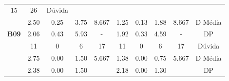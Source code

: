 \begin{table}[htbp]
\begin{tabular}{|cccccccccc}
		\multicolumn{1}{c|}{15} &
		\multicolumn{1}{c|}{26} &
		\multicolumn{1}{c|}{Dúvida} \\ \cline{2-10} 
		\rowcolor[HTML]{D9D9D9} 
		\multicolumn{1}{|c|}{\cellcolor[HTML]{F2F2F2}} &
		\multicolumn{1}{c|}{\cellcolor[HTML]{D9D9D9}2.50} &
		\multicolumn{1}{c|}{\cellcolor[HTML]{D9D9D9}0.25} &
		\multicolumn{1}{c|}{\cellcolor[HTML]{D9D9D9}3.75} &
		\multicolumn{1}{c|}{\cellcolor[HTML]{D9D9D9}8.667} &
		\multicolumn{1}{c|}{\cellcolor[HTML]{D9D9D9}1.25} &
		\multicolumn{1}{c|}{\cellcolor[HTML]{D9D9D9}0.13} &
		\multicolumn{1}{c|}{\cellcolor[HTML]{D9D9D9}1.88} &
		\multicolumn{1}{c|}{\cellcolor[HTML]{D9D9D9}8.667} &
		\multicolumn{1}{c|}{\cellcolor[HTML]{D9D9D9}D Média} \\ \cline{2-10} 
		\multicolumn{1}{|c|}{\multirow{-3}{*}{\cellcolor[HTML]{F2F2F2}\textbf{B09}}} &
		\multicolumn{1}{c|}{2.06} &
		\multicolumn{1}{c|}{0.43} &
		\multicolumn{1}{c|}{5.93} &
		\multicolumn{1}{c|}{-} &
		\multicolumn{1}{c|}{1.92} &
		\multicolumn{1}{c|}{0.33} &
		\multicolumn{1}{c|}{4.59} &
		\multicolumn{1}{c|}{-} &
		\multicolumn{1}{c|}{DP} \\ \hline
		\rowcolor[HTML]{D9D9D9} 
		\multicolumn{1}{|c|}{\cellcolor[HTML]{F2F2F2}} &
		\multicolumn{1}{c|}{\cellcolor[HTML]{D9D9D9}11} &
		\multicolumn{1}{c|}{\cellcolor[HTML]{D9D9D9}0} &
		\multicolumn{1}{c|}{\cellcolor[HTML]{D9D9D9}6} &
		\multicolumn{1}{c|}{\cellcolor[HTML]{D9D9D9}17} &
		\multicolumn{1}{c|}{\cellcolor[HTML]{D9D9D9}11} &
		\multicolumn{1}{c|}{\cellcolor[HTML]{D9D9D9}0} &
		\multicolumn{1}{c|}{\cellcolor[HTML]{D9D9D9}6} &
		\multicolumn{1}{c|}{\cellcolor[HTML]{D9D9D9}17} &
		\multicolumn{1}{c|}{\cellcolor[HTML]{D9D9D9}Dúvida} \\ \cline{2-10} 
		\multicolumn{1}{|c|}{\cellcolor[HTML]{F2F2F2}} &
		\multicolumn{1}{c|}{2.75} &
		\multicolumn{1}{c|}{0.00} &
		\multicolumn{1}{c|}{1.50} &
		\multicolumn{1}{c|}{5.667} &
		\multicolumn{1}{c|}{1.38} &
		\multicolumn{1}{c|}{0.00} &
		\multicolumn{1}{c|}{0.75} &
		\multicolumn{1}{c|}{5.667} &
		\multicolumn{1}{c|}{D Média} \\ \cline{2-10} 
		\rowcolor[HTML]{D9D9D9} 
		\multicolumn{1}{|c|}{\multirow{-3}{*}{\cellcolor[HTML]{F2F2F2}\textbf{B10}}} &
		\multicolumn{1}{c|}{\cellcolor[HTML]{D9D9D9}2.38} &
		\multicolumn{1}{c|}{\cellcolor[HTML]{D9D9D9}0.00} &
		\multicolumn{1}{c|}{\cellcolor[HTML]{D9D9D9}1.50} &
		\multicolumn{1}{c|}{\cellcolor[HTML]{D9D9D9}} &
		\multicolumn{1}{c|}{\cellcolor[HTML]{D9D9D9}2.18} &
		\multicolumn{1}{c|}{\cellcolor[HTML]{D9D9D9}0.00} &
		\multicolumn{1}{c|}{\cellcolor[HTML]{D9D9D9}1.30} &
		\multicolumn{1}{c|}{\cellcolor[HTML]{D9D9D9}} &
		\multicolumn{1}{c|}{\cellcolor[HTML]{D9D9D9}DP} \\ \hline
	\end{tabular}
	\label{tab:F3A1_Duvida_entradas}
\end{table}

